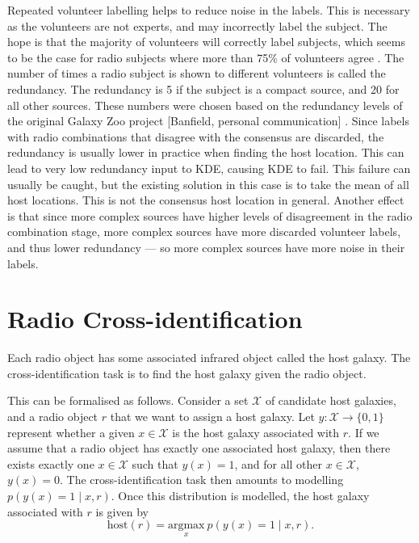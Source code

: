 \documentclass[11pt]{book}
\begin{document}
    Repeated volunteer labelling helps to reduce noise in the labels. This is
    necessary as the volunteers are not experts, and may incorrectly label the
    subject. The hope is that the majority of volunteers will correctly label
    subjects, which seems to be the case for radio subjects where more than
    75\% of volunteers agree \cite{banfield15}. The number of times a radio
    subject is shown to different volunteers is called the redundancy. The
    redundancy is 5 if the subject is a compact source, and 20 for all other
    sources. These numbers were chosen based on the redundancy levels of the
    original Galaxy Zoo project [Banfield, personal communication] . Since labels with radio combinations that disagree with
    the consensus are discarded, the redundancy is usually lower in practice
    when finding the host location. This can lead to very low redundancy input
    to KDE, causing KDE to fail. This failure can usually be caught, but the
    existing solution in this case is to take the mean of all host locations.
    This is not the consensus host location in general. Another effect is that
    since more complex sources have higher levels of disagreement in the radio
    combination stage, more complex sources have more discarded volunteer
    labels, and thus lower redundancy --- so more complex sources have more
    noise in their labels.

\section{Radio Cross-identification}
\label{sec:cross-identification}

    Each radio object has some associated infrared object called the host
    galaxy. The cross-identification task is to find the host galaxy given the
    radio object.
    
    This can be formalised as follows. Consider a set $\mathcal X$ of candidate
    host galaxies, and a radio object $r$ that we want to assign a host galaxy.
    Let $y : \mathcal X \to \{0, 1\}$ represent whether a given $x \in \mathcal
    X$ is the host galaxy associated with $r$. If we assume that a radio object
    has exactly one associated host galaxy, then there exists exactly one $x
    \in \mathcal X$ such that $y(x) = 1$, and for all other $x \in \mathcal X$,
    $y(x) = 0$. The cross-identification task then amounts to modelling $p(y(x)
    = 1 \mid x, r)$. Once this distribution is modelled, the host galaxy
    associated with $r$ is given by
    \begin{equation}
        \label{eq:cross-identification}
        \mbox{host}(r) = \underset{x}{\mbox{argmax}}\ p(y(x) = 1 \mid x, r).
    \end{equation}
\end{document}
